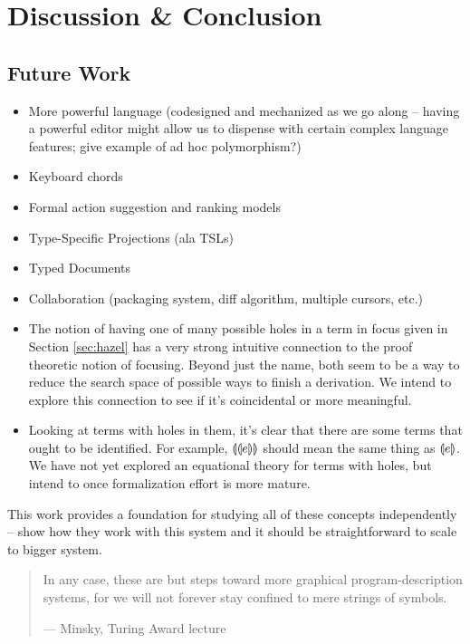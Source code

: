 \documentclass{llncs}
\begin{document}

\section{Discussion \& Conclusion}
\label{sec:future}
\subsection{Future Work}
\begin{itemize}
\item More powerful language (codesigned and mechanized as we go along --
  having a powerful editor might allow us to dispense with certain complex
  language features; give example of ad hoc polymorphism?)
\item Keyboard chords
\item Formal action suggestion and ranking models
\item Type-Specific Projections (ala TSLs)
\item Typed Documents
\item Collaboration (packaging system, diff algorithm, multiple cursors, etc.)

\item The notion of having one of many possible holes in a term in focus
  given in Section \ref{sec:hazel} has a very strong intuitive connection
  to the proof theoretic notion of focusing. \cite{Simmons11tr} Beyond just
  the name, both seem to be a way to reduce the search space of possible
  ways to finish a derivation. We intend to explore this connection to see
  if it's coincidental or more meaningful.

\item Looking at terms with holes in them, it's clear that there are some
  terms that ought to be identified. For example, $\llparenthesis\llparenthesis e\rrparenthesis\rrparenthesis$
  should mean the same thing as $\llparenthesis e\rrparenthesis$. We have not yet explored an
  equational theory for terms with holes, but intend to once formalization
  effort is more mature.
\end{itemize}

This work provides a foundation for studying all of these concepts
independently -- show how they work with this system and it should be
straightforward to scale to bigger system.

\begin{quote}
In any case, these are but steps toward more graphical program-description
systems, for we will not forever stay confined to mere strings of symbols.

--- Minsky, Turing Award lecture
\end{quote}

%
%


\end{document}

